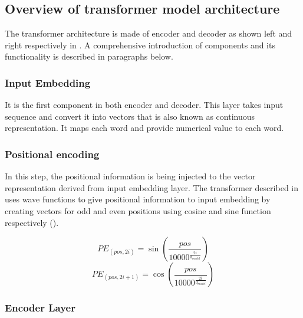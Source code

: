 \subsection{Overview of transformer model architecture}

The transformer architecture is made of encoder and decoder as shown left and right respectively in . A comprehensive introduction of components and its functionality is described in paragraphs below.

\subsubsection{Input Embedding}
It is the first component in both encoder and decoder. This layer takes input sequence and convert it into vectors that is also known as continuous representation. It maps each word  and provide numerical value to each word.

\subsubsection{Positional encoding}
In this step, the positional information is being injected to the vector representation derived from input embedding layer. The transformer described in \cite{vaswani2017attention} uses wave functions to give positional information to input embedding by creating vectors for odd and even positions using cosine and sine function respectively ().

\begin{equation}
    \label{eq:Wave_functions}
    PE_{(pos, 2i)} = \sin{\left(\frac{pos}{10000^\frac{2i}{d_{model}}}\right)}
\end{equation}
\[PE_{(pos, 2i+1)} = \cos{\left(\frac{pos}{10000^\frac{2i}{d_{model}}}\right)} \]

\subsubsection{Encoder Layer}





